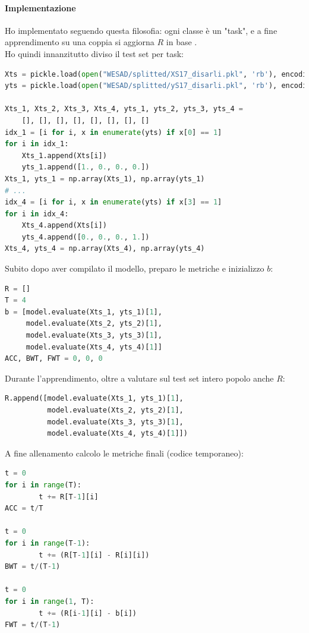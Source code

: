 \documentclass[11pt, a4paper, twoside, openright]{book}
\begin{document}
\paragraph{Implementazione} Ho implementato seguendo questa filosofia: ogni classe è un "task", e a fine apprendimento su una coppia si aggiorna $R$ in base .\\
Ho quindi innanzitutto diviso il test set per task:
\begin{lstlisting}[language = Python]
Xts = pickle.load(open("WESAD/splitted/XS17_disarli.pkl", 'rb'), encoding='latin1')
yts = pickle.load(open("WESAD/splitted/yS17_disarli.pkl", 'rb'), encoding='latin1')

Xts_1, Xts_2, Xts_3, Xts_4, yts_1, yts_2, yts_3, yts_4 =
    [], [], [], [], [], [], [], []
idx_1 = [i for i, x in enumerate(yts) if x[0] == 1]
for i in idx_1:
    Xts_1.append(Xts[i])
    yts_1.append([1., 0., 0., 0.])
Xts_1, yts_1 = np.array(Xts_1), np.array(yts_1)
# ...
idx_4 = [i for i, x in enumerate(yts) if x[3] == 1]
for i in idx_4:
    Xts_4.append(Xts[i])
    yts_4.append([0., 0., 0., 1.])
Xts_4, yts_4 = np.array(Xts_4), np.array(yts_4)
\end{lstlisting}
\pagebreak
Subito dopo aver compilato il modello, preparo le metriche e inizializzo $b$:
\begin{lstlisting}[language = Python]
R = []
T = 4
b = [model.evaluate(Xts_1, yts_1)[1],
     model.evaluate(Xts_2, yts_2)[1],
     model.evaluate(Xts_3, yts_3)[1],
     model.evaluate(Xts_4, yts_4)[1]]
ACC, BWT, FWT = 0, 0, 0
\end{lstlisting}
Durante l'apprendimento, oltre a valutare sul test set intero popolo anche $R$:
\begin{lstlisting}[language = Python]
R.append([model.evaluate(Xts_1, yts_1)[1],
          model.evaluate(Xts_2, yts_2)[1],
          model.evaluate(Xts_3, yts_3)[1],
          model.evaluate(Xts_4, yts_4)[1]])
\end{lstlisting}
A fine allenamento calcolo le metriche finali (codice temporaneo):
\begin{lstlisting}[language = Python]
t = 0
for i in range(T):
        t += R[T-1][i]
ACC = t/T

t = 0
for i in range(T-1):
        t += (R[T-1][i] - R[i][i])
BWT = t/(T-1)

t = 0
for i in range(1, T):
        t += (R[i-1][i] - b[i])
FWT = t/(T-1)
\end{lstlisting}
\pagebreak
\end{document}
